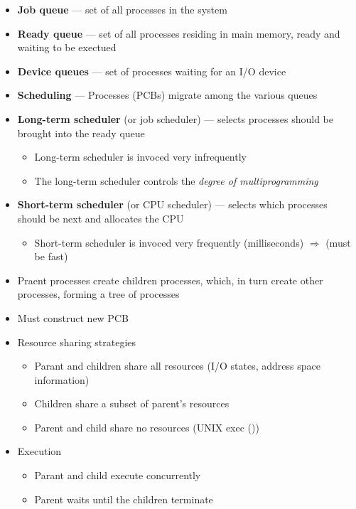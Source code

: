 \documentclass[titlepage]{article}
\begin{document}
  \begin{itemize}
    \item {\color{blue} \textbf{Job queue}} --- set of all processes in the system
    \item {\color{blue} \textbf{Ready queue}} --- set of all processes residing in main memory, ready and waiting to be exectued
    \item {\color{blue} \textbf{Device queues}} --- set of processes waiting for an I/O device
    \item {\color{blue} \textbf{Scheduling}} --- Processes (PCBs) migrate among the various queues
    \item {\color{blue} \textbf{Long-term scheduler}} (or job scheduler) --- selects processes should be brought into the ready queue
    \begin{itemize}
      \item Long-term scheduler is invoced very infrequently
      \item The long-term scheduler controls the \textit{degree of multiprogramming}
    \end{itemize}
    \item {\color{blue} \textbf{Short-term scheduler}} (or CPU scheduler) --- selects which processes should be next and allocates the CPU
    \begin{itemize}
      \item Short-term scheduler is invoced very frequently (milliseconds) $\Rightarrow$ (must be fast)
    \end{itemize}
    \item Praent processes create children processes, which, in turn create other processes, forming a tree of processes
    \item Must construct new PCB
    \item Resource sharing strategies
    \begin{itemize}
      \item Parant and children share all resources (I/O states, address space information)
      \item Children share a subset of parent's resources
      \item Parent and child share no resources (UNIX exec ())
    \end{itemize}
    \item Execution
    \begin{itemize}
      \item Parant and child execute concurrently
      \item Parent waits until the children terminate
    \end{itemize}
  \end{itemize}
\end{document}
